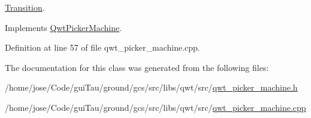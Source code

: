 \hyperlink{class_transition}{Transition}. 



Implements \hyperlink{class_qwt_picker_machine_acf7b57003bec437ce1ecf83e6d544968}{Qwt\-Picker\-Machine}.



Definition at line 57 of file qwt\-\_\-picker\-\_\-machine.\-cpp.



The documentation for this class was generated from the following files\-:\begin{DoxyCompactItemize}
\item 
/home/jose/\-Code/gui\-Tau/ground/gcs/src/libs/qwt/src/\hyperlink{qwt__picker__machine_8h}{qwt\-\_\-picker\-\_\-machine.\-h}\item 
/home/jose/\-Code/gui\-Tau/ground/gcs/src/libs/qwt/src/\hyperlink{qwt__picker__machine_8cpp}{qwt\-\_\-picker\-\_\-machine.\-cpp}\end{DoxyCompactItemize}
